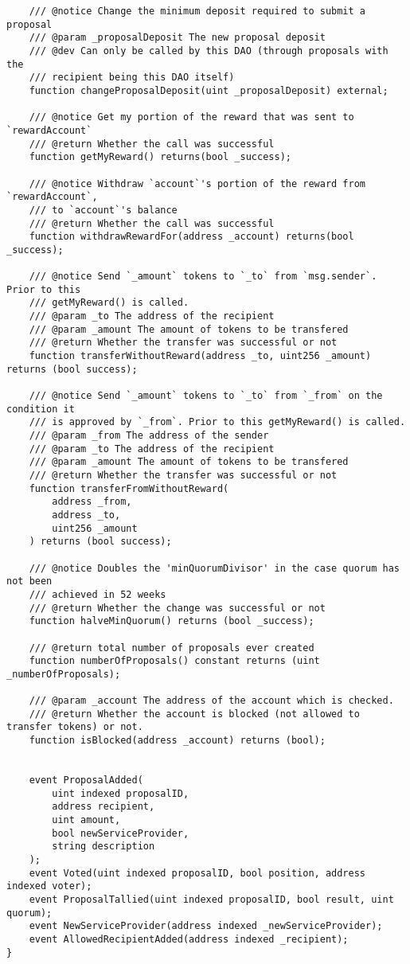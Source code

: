 \documentclass[9pt,oneside]{amsart}
\begin{document}
\begin{appendix}
\begin{verbatim}
    /// @notice Change the minimum deposit required to submit a proposal
    /// @param _proposalDeposit The new proposal deposit
    /// @dev Can only be called by this DAO (through proposals with the
    /// recipient being this DAO itself)
    function changeProposalDeposit(uint _proposalDeposit) external;

    /// @notice Get my portion of the reward that was sent to `rewardAccount`
    /// @return Whether the call was successful
    function getMyReward() returns(bool _success);

    /// @notice Withdraw `account`'s portion of the reward from `rewardAccount`,
    /// to `account`'s balance
    /// @return Whether the call was successful
    function withdrawRewardFor(address _account) returns(bool _success);

    /// @notice Send `_amount` tokens to `_to` from `msg.sender`. Prior to this
    /// getMyReward() is called.
    /// @param _to The address of the recipient
    /// @param _amount The amount of tokens to be transfered
    /// @return Whether the transfer was successful or not
    function transferWithoutReward(address _to, uint256 _amount) returns (bool success);

    /// @notice Send `_amount` tokens to `_to` from `_from` on the condition it
    /// is approved by `_from`. Prior to this getMyReward() is called.
    /// @param _from The address of the sender
    /// @param _to The address of the recipient
    /// @param _amount The amount of tokens to be transfered
    /// @return Whether the transfer was successful or not
    function transferFromWithoutReward(
        address _from,
        address _to,
        uint256 _amount
    ) returns (bool success);

    /// @notice Doubles the 'minQuorumDivisor' in the case quorum has not been
    /// achieved in 52 weeks
    /// @return Whether the change was successful or not
    function halveMinQuorum() returns (bool _success);

    /// @return total number of proposals ever created
    function numberOfProposals() constant returns (uint _numberOfProposals);

    /// @param _account The address of the account which is checked.
    /// @return Whether the account is blocked (not allowed to transfer tokens) or not.
    function isBlocked(address _account) returns (bool);


    event ProposalAdded(
        uint indexed proposalID,
        address recipient,
        uint amount,
        bool newServiceProvider,
        string description
    );
    event Voted(uint indexed proposalID, bool position, address indexed voter);
    event ProposalTallied(uint indexed proposalID, bool result, uint quorum);
    event NewServiceProvider(address indexed _newServiceProvider);
    event AllowedRecipientAdded(address indexed _recipient);
}


\end{verbatim}
\end{appendix}
\end{document}
